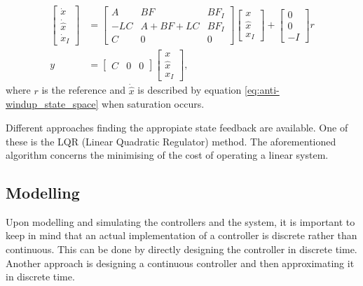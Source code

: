 \documentclass[../../main.tex]{subfiles}
\begin{document}
\begin{equation}\label{eq:state_space_modern_control}
\begin{split}
\begin{bmatrix}
        \dot{x} \\
        \dot{\hat{x}}\\
        \dot{x}_I
    \end{bmatrix} &=
    \begin{bmatrix}
        A & BF & BF_I \\
        -LC & A+BF+LC & BF_I \\
        C & 0 & 0
    \end{bmatrix}
    \begin{bmatrix}
        x \\
        \hat{x} \\
        x_I
    \end{bmatrix}
    + 
    \begin{bmatrix}
    0\\
    0\\
    -I
    \end{bmatrix}
    r \\
    y &= \begin{bmatrix}
        C & 0 & 0
    \end{bmatrix}     
    \begin{bmatrix}
        x \\
        \hat{x} \\
        x_I
    \end{bmatrix}, 
    \end{split}
\end{equation}
where $r$ is the reference and $\Dot{\hat{x}}$ is described by equation \ref{eq:anti-windup_state_space} when saturation occurs.

Different approaches finding the appropiate state feedback are available. One of these is the LQR (Linear Quadratic Regulator) method. The aforementioned algorithm concerns the minimising of the cost of operating a linear system. 

\subsection*{Modelling}
Upon modelling and simulating the controllers and the system, it is important to keep in mind that an actual implementation of a controller is discrete rather than continuous. This can be done by directly designing the controller in discrete time. Another approach is designing a continuous controller and then approximating it in discrete time.
\end{document}
